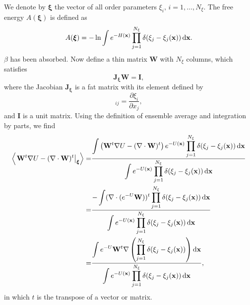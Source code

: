 We denote by $\boldsymbol{\xi}$ the vector of all order parameters $\xi_i,\,i=1,\dots,N_\xi$. The free energy $A(\boldsymbol{\xi})$ is defined as
\begin{equation}
    A(\boldsymbol{\xi})=-\ln\int e^{-H(\mathbf{x})}\prod_{j=1}^{N_\xi}\delta(\xi_j-\xi_j(\mathbf{x}))\mathop{}\!\mathrm{d} \mathbf{x}.
\end{equation}
$\beta$ has been absorbed. Now define a thin matrix $\mathbf{W}$ with $N_\xi$ columns, which satisfies
\begin{equation}
    \mathbf{J}_{\boldsymbol{\xi}} \mathbf{W}=\mathbf{I},
\end{equation} 
where the Jacobian $\mathbf{J}_{\boldsymbol{\xi}}$ is a fat matrix with its element defined by
\begin{equation}
    [\mathbf{J}_{\boldsymbol{\xi}}]_{ij}=\frac{\partial \xi_i}{\partial x_j},
\end{equation}
and $\mathbf{I}$ is a unit matrix. Using the definition of ensemble average and integration by parts, we find
\begin{align}
    \left<\left.\mathbf{W}^t\nabla U-(\nabla\cdot \mathbf{W})^t\right|_{\boldsymbol{\xi}}\right>=&\frac{\displaystyle\int\left(\mathbf{W}^t\nabla U-(\nabla\cdot \mathbf{W})^t\right)e^{-U(\mathbf{x})}\prod\limits_{j=1}^{N_\xi}\delta(\xi_j-\xi_j(\mathbf{x}))\mathop{}\!\mathrm{d} \mathbf{x}}{\displaystyle\int e^{-U(\mathbf{x})}\prod\limits_{j=1}^{N_\xi}\delta(\xi_j-\xi_j(\mathbf{x}))\mathop{}\!\mathrm{d} \mathbf{x}}\notag\\
    =&\frac{-\displaystyle\int (\nabla\cdot(e^{-U}\mathbf{W}))^t\prod\limits_{j=1}^{N_\xi}\delta(\xi_j-\xi_j(\mathbf{x}))\mathop{}\!\mathrm{d}\mathbf{x}}{\displaystyle\int e^{-U(\mathbf{x})}\prod\limits_{j=1}^{N_\xi}\delta(\xi_j-\xi_j(\mathbf{x}))\mathop{}\!\mathrm{d} \mathbf{x}}\notag\\
    =&\frac{\displaystyle\int e^{-U}\mathbf{W}^t\nabla\left(\prod\limits_{j=1}^{N_\xi}\delta(\xi_j-\xi_j(\mathbf{x}))\right)\mathop{}\!\mathrm{d} \mathbf{x}}{\displaystyle\int e^{-U(\mathbf{x})}\prod\limits_{j=1}^{N_\xi}\delta(\xi_j-\xi_j(\mathbf{x}))\mathop{}\!\mathrm{d} \mathbf{x}},
\end{align}
in which $t$ is the transpose of a vector or matrix.

